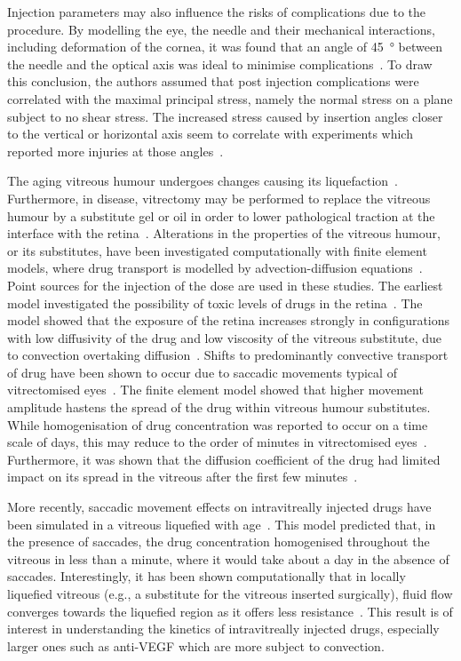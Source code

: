 \documentclass{article}
\begin{document}
Injection parameters may also influence the risks of complications due to the procedure.
By modelling the eye, the needle and their mechanical interactions, including deformation of the cornea, it was found that an angle of \SI{45}{\degree} between the needle and the optical axis was ideal to minimise complications~\cite{Karimi_2018}.
To draw this conclusion, the authors assumed that post injection complications were correlated with the maximal principal stress, namely the normal stress on a plane subject to no shear stress.  
The increased stress caused by insertion angles closer to the vertical or horizontal axis seem to correlate with experiments which reported more injuries at those angles~\cite{Karimi_2018}.

The aging vitreous humour undergoes changes causing its liquefaction~\cite{Los_2003}.
Furthermore, in disease, vitrectomy may be performed to replace the vitreous humour by a substitute gel or oil in order to lower pathological traction at the interface with the retina~\cite{Dervenis_2022}.
Alterations in the properties of the vitreous humour, or its substitutes, have been investigated computationally with finite element models, where drug transport is modelled by advection-diffusion equations~\cite{Kathawate_2008,Modareszadeh_2012}.
Point sources for the injection of the dose are used in these studies.
The earliest model investigated the possibility of toxic levels of drugs in the retina~\cite{Kathawate_2008}.
The model showed that the exposure of the retina increases strongly in configurations with low diffusivity of the drug and low viscosity of the vitreous substitute, due to convection overtaking diffusion~\cite{Kathawate_2008}.
Shifts to predominantly convective transport of drug have been shown to occur due to saccadic movements typical of vitrectomised eyes~\cite{Modareszadeh_2012}.
The finite element model showed that higher movement amplitude hastens the spread of the drug within vitreous humour substitutes.
While homogenisation of drug concentration was reported to occur on a time scale of days, this may reduce to the order of minutes in vitrectomised eyes~\cite{Modareszadeh_2012}.
Furthermore, it was shown that the diffusion coefficient of the drug had limited impact on its spread in the vitreous after the first few minutes~\cite{Modareszadeh_2012}.

More recently, saccadic movement effects on intravitreally injected drugs have been simulated in a vitreous liquefied with age~\cite{Ferroni_2020}.
This model predicted that, in the presence of saccades, the drug concentration homogenised throughout the vitreous in less than a minute, where it would take about a day in the absence of saccades.
Interestingly, it has been shown computationally that in locally liquefied vitreous (e.g., a substitute for the vitreous inserted surgically), fluid flow converges towards the liquefied region as it offers less resistance~\cite{Khoobyar_2022}.
This result is of interest in understanding the kinetics of intravitreally injected drugs, especially larger ones such as anti-VEGF which are more subject to convection.
\end{document}
